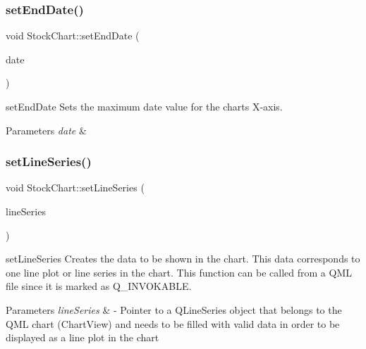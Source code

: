 \subsubsection{\texorpdfstring{set\+End\+Date()}{setEndDate()}}
{\footnotesize\ttfamily void Stock\+Chart\+::set\+End\+Date (\begin{DoxyParamCaption}\item[{const Q\+String \&}]{date }\end{DoxyParamCaption})}



set\+End\+Date Sets the maximum date value for the chart\textquotesingle{}s X-\/axis. 


\begin{DoxyParams}{Parameters}
{\em date} & \\
\hline
\end{DoxyParams}
\mbox{\label{class_stock_chart_a263508e678183faf4ce6a98ecab71405}} 
\subsubsection{\texorpdfstring{set\+Line\+Series()}{setLineSeries()}}
{\footnotesize\ttfamily void Stock\+Chart\+::set\+Line\+Series (\begin{DoxyParamCaption}\item[{Q\+Line\+Series $\ast$}]{line\+Series }\end{DoxyParamCaption})}



set\+Line\+Series Creates the data to be shown in the chart. This data corresponds to one line plot or line series in the chart. This function can be called from a Q\+ML file since it is marked as Q\+\_\+\+I\+N\+V\+O\+K\+A\+B\+LE. 


\begin{DoxyParams}{Parameters}
{\em line\+Series} & -\/ Pointer to a Q\+Line\+Series object that belongs to the Q\+ML chart (Chart\+View) and needs to be filled with valid data in order to be displayed as a line plot in the chart \\
\hline
\end{DoxyParams}
\mbox{\label{class_stock_chart_abf5fe9792d1587718d89892776a7ce7a}} 
